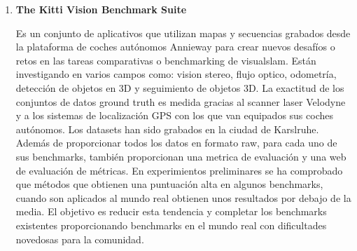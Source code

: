 \begin {enumerate}
SLAMBench está siendo un componente muy importante en robótica y Sistemas de Realidad Aumentada (AR). Aunque un gran número de algoritmos SLAM han sido presentados, no se ha investigado lo suficente para tratar de unificar el interface de estos algoritmos, o realizar comparaciones de todas sus capacidades en conjunto. Esto presenta un problema ya que diferentes aplicaciones SLAM pueden tener diferentes requisitos funcionales y no funcionales. Por ejemplo, una solución para Realidad Aumentada desarrollada para móviles tendría que optimizar el consumo de energía, mientras que otra solución diseñada para vehículos de navegación autónoma estaría enfocada a funcionar con la mayor exactitud posible. SLAMBench2 es un framework de evaluación que compararía sistemas SLAM actuales y futuros, utilizando una lista extensible de datasets, mientras utiliza una lista comparable de métricas de rendimiento. Se podrían utilizar una gran variedad de algoritmos de SLAM y datasets como ElasticFusion, ORB-SLAM2, OKVIS y tambien se podría integrar con nuevos algoritmos y datasets. SLAMBench2 es un software que está disponible de manera pública. 

\item \textbf{The Kitti Vision Benchmark Suite }

Es un conjunto de aplicativos que utilizan mapas y secuencias grabados desde la plataforma de coches autónomos Annieway para crear nuevos desafíos o retos en las tareas comparativas o benchmarking de visualslam.\cite{Geiger2012CVPR}
Están investigando en varios campos como: vision stereo, flujo optico, odometría, detección de objetos en 3D y seguimiento de objetos 3D.
La exactitud de los conjuntos de datos ground truth es medida gracias al scanner laser Velodyne y a los sistemas de localización GPS con los que van equipados sus coches autónomos.
Los datasets han sido grabados en la ciudad de Karslruhe.
Además de proporcionar todos los datos en formato raw, para cada uno de sus benchmarks, también proporcionan una metrica de evaluación y una web de evaluación de métricas. En experimientos preliminares se ha comprobado que métodos que obtienen una puntuación alta en algunos benchmarks, cuando son aplicados al mundo real obtienen unos resultados por debajo de la media. El objetivo es reducir esta tendencia y completar los benchmarks existentes proporcionando benchmarks en el mundo real con dificultades novedosas para la comunidad. 


\end{enumerate}

